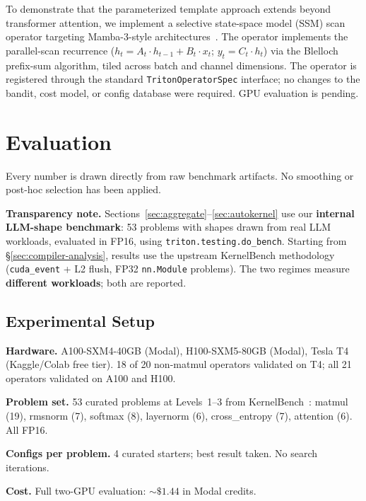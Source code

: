 \documentclass[11pt]{article}
\begin{document}
To demonstrate that the parameterized template approach extends beyond
transformer attention, we implement a selective state-space model (SSM) scan
operator targeting Mamba-3-style architectures~\citep{mamba2}. The operator
implements the parallel-scan recurrence ($h_t = A_t \cdot h_{t-1} + B_t \cdot
x_t$; $y_t = C_t \cdot h_t$) via the Blelloch prefix-sum algorithm, tiled across
batch and channel dimensions. The operator is registered through the standard
\texttt{TritonOperatorSpec} interface; no changes to the bandit, cost model, or
config database were required. GPU evaluation is pending.


\section{Evaluation}
\label{sec:eval}

Every number is drawn directly from raw benchmark artifacts. No smoothing or
post-hoc selection has been applied.

\textbf{Transparency note.} Sections~\ref{sec:aggregate}--\ref{sec:autokernel}
use our \textbf{internal LLM-shape benchmark}: 53 problems with shapes drawn
from real LLM workloads, evaluated in FP16, using \texttt{triton.testing.do\_bench}.
Starting from \S\ref{sec:compiler-analysis}, results use the upstream KernelBench
methodology (\texttt{cuda\_event} + L2 flush, FP32 \texttt{nn.Module} problems).
The two regimes measure \textbf{different workloads}; both are reported.


\subsection{Experimental Setup}
\label{sec:setup}

\textbf{Hardware.} A100-SXM4-40GB (Modal), H100-SXM5-80GB (Modal), Tesla T4
(Kaggle/Colab free tier). 18 of 20 non-matmul operators validated on T4; all 21
operators validated on A100 and H100.

\textbf{Problem set.} 53 curated problems at Levels~1--3 from
KernelBench~\citep{kernelbench}: matmul (19), rmsnorm (7), softmax (8),
layernorm (6), cross\_entropy (7), attention (6). All FP16.

\textbf{Configs per problem.} 4 curated starters; best result taken. No search
iterations.

\textbf{Cost.} Full two-GPU evaluation: ${\sim}\$1.44$ in Modal credits.
\end{document}
